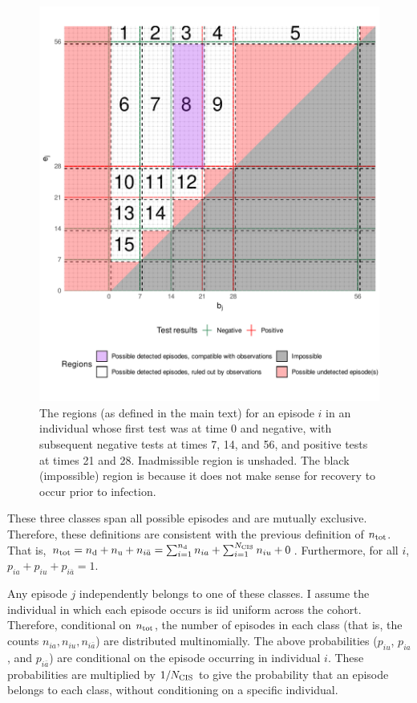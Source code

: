\documentclass[thesis.tex]{subfiles}
\begin{document}
\begin{figure}
\includegraphics[width=\textwidth]{cis-perfect-testing/regions_diag}
\caption[Admissible, inadmissible, and undetected infections]{The regions (as defined in the main text) for an episode $i$ in an
individual whose first test was at time 0 and negative, with subsequent
negative tests at times 7, 14, and 56, and positive tests at times 21
and 28. Inadmissible region is unshaded. The black (impossible) region is because it does not make sense for recovery to occur prior to infection. \label{perf-test:fig:partitionSpace}}
\end{figure}

These three classes span all possible episodes and are mutually exclusive.
Therefore, these definitions are consistent with the previous definition of $n_\text{tot}$.
That is, $n_\text{tot} = n_\text{d} + n_\text{u} + n_{i\bar{a}} = \sum_{i=1}^{n_\text{d}} n_{ia} + \sum_{i=1}^{N_\text{CIS}} n_{iu} + 0$.
Furthermore, for all $i$, $p_{ia} + p_{iu} + p_{i\bar{a}} = 1$.

Any episode $j$ independently belongs to one of these classes.
I assume the individual in which each episode occurs is iid uniform across the cohort.
Therefore, conditional on $n_\text{tot}$, the number of episodes in each class (that is, the counts $n_{ia}, n_{iu}, n_{i\bar{a}}$) are distributed multinomially.
The above probabilities ($p_{iu}$, $p_{ia}$, and $p_{i\bar{a}}$) are conditional on the episode occurring in individual $i$.
These probabilities are multiplied by $1/N_\text{CIS}$ to give the probability that an episode belongs to each class, without conditioning on a specific individual.
\end{document}
